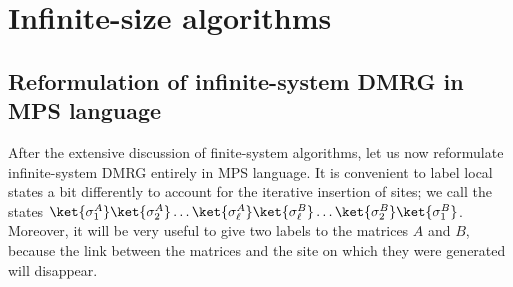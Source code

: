 \section{Infinite-size algorithms}
\label{sec:infinite}

\subsection{Reformulation of infinite-system DMRG in MPS language}

After the extensive discussion of finite-system algorithms, let us now reformulate infinite-system DMRG entirely in MPS language. It is convenient to label local states a bit differently to account for the iterative insertion of sites; we call the states $\ket{\sigma_1^A} \ket{\sigma_2^A} \ldots \ket{\sigma_\ell^A}\ket{\sigma_\ell^B} \ldots \ket{\sigma_2^B}\ket{\sigma_1^B}$. Moreover, it will be very useful to give two labels to the matrices $A$ and $B$, 
because the link between the matrices and the site on which they were generated will disappear.


